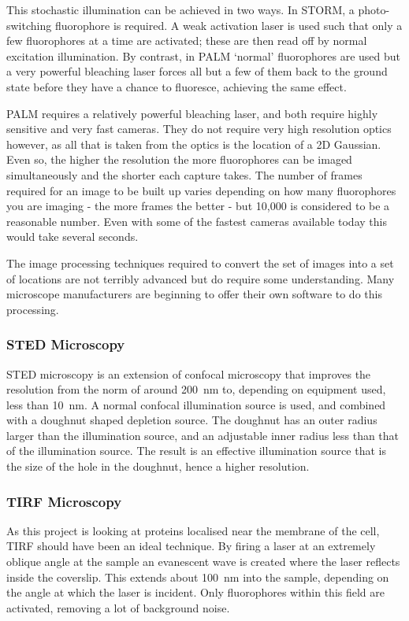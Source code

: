 \documentclass[../main.tex]{subfiles}
\begin{document}
This stochastic illumination can be achieved in two ways. In STORM, a photo-switching fluorophore is required. A weak activation laser is used such that only a few fluorophores at a time are activated; these are then read off by normal excitation illumination. By contrast, in PALM `normal' fluorophores are used but a very powerful bleaching laser forces all but a few of them back to the ground state before they have a chance to fluoresce, achieving the same effect.

PALM requires a relatively powerful bleaching laser, and both require highly sensitive and very fast cameras. They do not require very high resolution optics however, as all that is taken from the optics is the location of a 2D Gaussian. Even so, the higher the resolution the more fluorophores can be imaged simultaneously and the shorter each capture takes. The number of frames required for an image to be built up varies depending on how many fluorophores you are imaging - the more frames the better - but 10,000 is considered to be a reasonable number. Even with some of the fastest cameras available today this would take several seconds.

The image processing techniques required to convert the set of images into a set of locations are not terribly advanced but do require some understanding. Many microscope manufacturers are beginning to offer their own software to do this processing.

\subsubsection{STED Microscopy}

STED microscopy is an extension of confocal microscopy that improves the resolution from the norm of around \SI{200}{\nano\meter} to, depending on equipment used, less than \SI{10}{\nano\meter}\cite{rittweger09}. A normal confocal illumination source is used, and combined with a doughnut shaped depletion source. The doughnut has an outer radius larger than the illumination source, and an adjustable inner radius less than that of the illumination source. The result is an effective illumination source that is the size of the hole in the doughnut, hence a higher resolution.

\subsubsection{TIRF Microscopy}
As this project is looking at proteins localised near the membrane of the cell, TIRF should have been an ideal technique. By firing a laser at an extremely oblique angle at the sample an evanescent wave is created where the laser reflects inside the coverslip. This extends about \SI{100}{\nano\meter} into the sample, depending on the angle at which the laser is incident. Only fluorophores within this field are activated, removing a lot of background noise.
\end{document}
